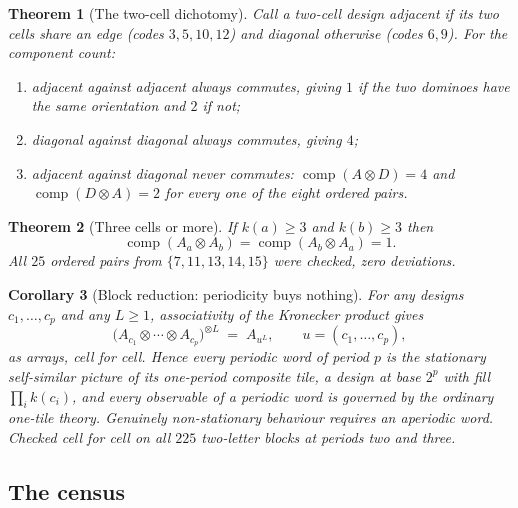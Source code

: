 \documentclass[11pt]{amsart}
\newtheorem{theorem}{Theorem}[section]
\newtheorem{corollary}[theorem]{Corollary}
\theoremstyle{definition}
\theoremstyle{remark}
\begin{document}
\begin{theorem}[The two-cell dichotomy]
\label{thm:dichotomy}
Call a two-cell design \emph{adjacent} if its two cells share an edge (codes $3, 5, 10, 12$) and \emph{diagonal} otherwise (codes $6, 9$). For the component count:
\begin{enumerate}
\item adjacent against adjacent always commutes, giving $1$ if the two dominoes have the same orientation and $2$ if not;
\item diagonal against diagonal always commutes, giving $4$;
\item adjacent against diagonal \emph{never} commutes: $\operatorname{comp}(A \otimes D) = 4$ and $\operatorname{comp}(D \otimes A) = 2$ for every one of the eight ordered pairs.
\end{enumerate}
\end{theorem}

\begin{theorem}[Three cells or more]
\label{thm:kthree}
If $k(a) \ge 3$ and $k(b) \ge 3$ then
\[
  \operatorname{comp}(A_a \otimes A_b) = \operatorname{comp}(A_b \otimes A_a) = 1 .
\]
All $25$ ordered pairs from $\{7,11,13,14,15\}$ were checked, zero deviations.
\end{theorem}

\begin{corollary}[Block reduction: periodicity buys nothing]
\label{cor:block}
For any designs $c_1,\dots,c_p$ and any $L \ge 1$, associativity of the Kronecker product gives
\[
  \bigl(A_{c_1} \otimes \cdots \otimes A_{c_p}\bigr)^{\otimes L} \;=\; A_{u^L}, \qquad u = (c_1,\dots,c_p),
\]
as arrays, cell for cell. Hence every periodic word of period $p$ is the stationary self-similar picture of its one-period composite tile, a design at base $2^p$ with fill $\prod_i k(c_i)$, and every observable of a periodic word is governed by the ordinary one-tile theory. Genuinely non-stationary behaviour requires an aperiodic word. Checked cell for cell on all $225$ two-letter blocks at periods two and three.
\end{corollary}

\subsection{The census}
\end{document}
